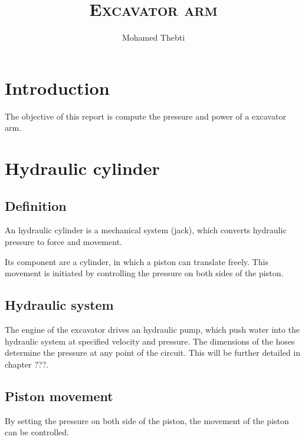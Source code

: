 \documentclass[12pt,a4paper]{article}
\title{
	\Huge\textsc{Excavator arm}
}
\author{Mohamed Thebti}
\begin{document}
	\setlength{\parindent}{0mm}
	
	\fancyhead[R]{\slshape \leftmark}
	
	\fancyfoot[C]{}
	\fancyfoot[R]{\thepage}
	
	\maketitle
	\newpage
	
	\tableofcontents
	
	\newpage
	
	
	
	\section{Introduction}
	
	The objective of this report is compute the pressure and power of a excavator arm. 
	
	
	\section{Hydraulic cylinder}
	
	\subsection{Definition}
	An hydraulic cylinder is a mechanical system (jack), which converts hydraulic pressure to force and movement.
	
	Its component are a cylinder, in which a piston can translate freely. This movement is initiated by controlling the pressure on both sides of the piston. 
	
	\subsection{Hydraulic system}
	The engine of the excavator drives an hydraulic pump, which push water into the hydraulic system at specified velocity and pressure. The dimensions of the hoses determine the pressure at any point of the circuit. This will be further detailed in chapter ???.
	
	\subsection{Piston movement}
	By setting the pressure on both side of the piston, the movement of the piston can be controlled. \\
	
\end{document}
